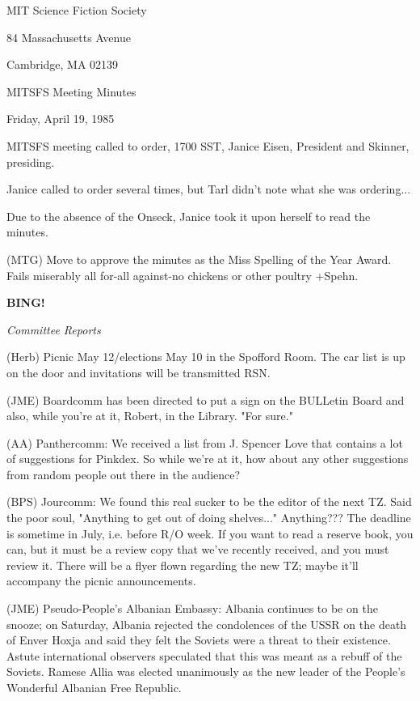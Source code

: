 \documentclass[12pt]{article}
\newcommand{\bing}{{\bf BING!} }
\newcommand{\goto}[1]{\bing \vskip 12pt \centerline{{\em{#1}}}}
\begin{document}
\begin{center}

MIT Science Fiction Society 

84 Massachusetts Avenue

Cambridge, MA 02139

\vspace{12pt}

MITSFS Meeting Minutes 

Friday, April 19, 1985

\end{center}
 
\vspace{18pt}

\setlength{\parskip}{6pt}

\noindent
MITSFS meeting called to order, 1700 SST,
Janice Eisen, President and Skinner, presiding.

Janice called to order several times, but Tarl didn't note what she was ordering...

Due to the absence of the Onseck, Janice took it upon herself to read the minutes.

(MTG) Move to approve the minutes as the Miss Spelling of the Year Award. Fails miserably all for-all against-no chickens or other poultry +Spehn.

\goto{Committee Reports}

(Herb) Picnic May 12/elections May 10 in the Spofford Room. The car list is up on the door and invitations will be transmitted RSN.

(JME) Boardcomm has been directed to put a sign on the BULLetin Board and also, while you're at it, Robert, in the Library. "For sure."

(AA) Panthercomm: We received a list from J. Spencer Love that contains a lot of suggestions for Pinkdex. So while we're at it, how about any other suggestions from random people out there in the audience?

(BPS) Jourcomm: We found this real sucker to be the editor of the next TZ. Said the poor soul, "Anything to get out of doing shelves..." Anything??? The deadline is sometime in July, i.e. before R/O week. If you want to read a reserve book, you can, but it must be a review copy that we've recently received, and you must review it. There will be a flyer flown regarding the new TZ; maybe it'll accompany the picnic announcements.

(JME) Pseudo-People's Albanian Embassy: Albania continues to be on the snooze; on Saturday, Albania rejected the condolences of the USSR on the death of Enver Hoxja and said they felt the Soviets were a threat to their existence. Astute international observers speculated that this was meant as a rebuff of the Soviets. Ramese Allia was elected unanimously as the new leader of the People's Wonderful Albanian Free Republic.
\end{document}
